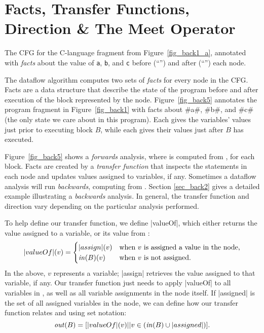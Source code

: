 \documentclass[12pt]{report}
\begin{document}
\section{Facts, Transfer Functions, Direction \& The Meet Operator}
\label{sec_back4}

\begin{myfig}[th]
\centering

\caption{The CFG for the C-language fragment from
  Figure~\ref{fig_back1_a}, annotated with \emph{facts} about the
  value of \texttt{a}, \texttt{b}, and \texttt{c} before (``\inBa'') and
  after (``\outBa'') each node.}
\label{fig_back5}
\end{myfig}

The dataflow algorithm computes two sets of \emph{facts} for every
node in the CFG. Facts are a data structure that describe the state of
the program before and after execution of the block represented by the
node. Figure~\ref{fig_back5} annotates the program fragment in
Figure~\ref{fig_back1} with facts about #a#, #b#, and #c# (the only
state we care about in this program). Each \inBa gives the variables'
values just prior to executing block $B$, while each \outBa gives
their values just after $B$ has executed.  

Figure~\ref{fig_back5} shows a \emph{forwards} analysis, where \outBa
is computed from \inBa, for each block. Facts are created by a
\emph{transfer function} that inspects the statements in each node and
updates values assigned to variables, if any. Sometimes a dataflow
analysis will run \emph{backwards}, computing \inBa from
\outBa. Section \ref{sec_back2} gives a detailed example illustrating
a \emph{backwards} analysis. In general, the transfer function and
direction vary depending on the particular analysis performed.

To help define our transfer function, we define |valueOf|,
which either returns the value assigned to a variable, or its value
from \inBa:
\begin{equation} |valueOf|(v) = 
  \begin{cases}
    |assign|(v) & \text{when $v$ is assigned a value in the node,} \\
    \text{\ensuremath{\mathit{in}(B)}}(v) & \text{when $v$ is not assigned.} 
  \end{cases}
\label{eqn_back2}
\end{equation}
In the above, $v$ represents a variable; |assign| retrieves the value
assigned to that variable, if any.  Our transfer function just needs
to apply |valueOf| to all variables in \inBa, as well as all
variable assignments in the node itself. If |assigned| is the set of
all assigned variables in the node, we can define how our transfer
function relates \inBa and \outBa using set notation:
\begin{equation}
  \text{\ensuremath{\mathit{out}(B)}} = [|valueOf|(v) || v \in (\text{\ensuremath{\mathit{in}(B)}} \cup |assigned|)].
\end{equation}
\end{document}
